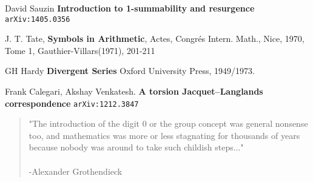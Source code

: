 \documentclass[12pt]{article}
\begin{document}
\vfill



\begin{thebibliography}{}

\item David Sauzin \textbf{Introduction to 1-summability and resurgence} \texttt{arXiv:1405.0356}

\item J. T. Tate, \textbf{Symbols in Arithmetic}, Actes, Congr\'{e}s Intern. Math., Nice, 1970, Tome 1, Gauthier-Villars(1971), 201-211

\item GH Hardy \textbf{Divergent Series}  Oxford University Press, 1949/1973.

\item Frank Calegari, Akshay Venkatesh.  \textbf{A torsion Jacquet--Langlands correspondence} \texttt{arXiv:1212.3847}

\end{thebibliography}
\vspace{0.5in}

\begin{quotation}
\noindent "The introduction of the digit 0 or the group concept was general nonsense too, and mathematics was more or less stagnating for thousands of years because nobody was around to take such childish steps..." \\ \\
-Alexander Grothendieck
\end{quotation}
\end{document}
